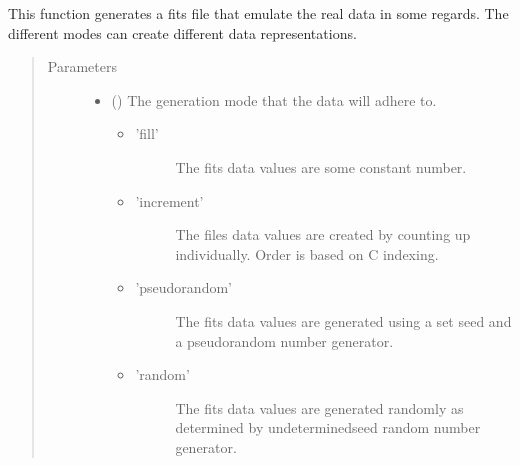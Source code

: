 \documentclass[letterpaper,10pt,english]{sphinxmanual}
\begin{document}
\begin{fulllineitems}
\label{\detokenize{docstrings/ifa_smeargle.tutorial.generation:ifa_smeargle.tutorial.generation.tutorial_generate_fits_file}}
This function generates a fits file that emulate
the real data in some regards. The different modes can create
different data representations.
\begin{quote}\begin{description}
\item[{Parameters}] \leavevmode\begin{itemize}
\item {} 
 () \textendash{} 
The generation mode that the data will adhere to.
\begin{itemize}
\item {} \begin{description}
\item[{’fill’}] \leavevmode
The fits data values are some constant number.

\end{description}

\item {} \begin{description}
\item[{’increment’}] \leavevmode
The files data values are created by counting
up individually. Order is based on C indexing.

\end{description}

\item {} \begin{description}
\item[{’pseudorandom’}] \leavevmode
The fits data values are generated using
a set seed and a pseudorandom number generator.

\end{description}

\item {} \begin{description}
\item[{’random’}] \leavevmode
The fits data values are generated randomly
as determined by undetermined\sphinxhyphen{}seed random number
generator.


\end{description}
\end{itemize}
\end{itemize}
\end{description}
\end{quote}
\end{fulllineitems}
\end{document}
